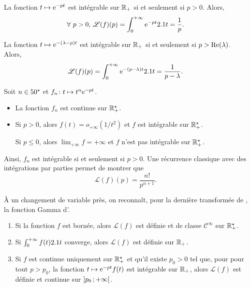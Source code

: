\begin{solution}
\begin{reponses}
\item La fonction $t \mapsto \e^{-pt}$ est intégrable sur $\Rp$ si et seulement si $p > 0$. Alors,
\[
\forall\, p > 0,\,
\mathscr{L}(f)(p) = \int_0^{+\infty} \e^{-pt} \d t = \frac{1}{p}.
\]

\item La fonction $t \mapsto \e^{-(\lambda-p)t}$ est intégrable sur $\Rp$ si et seulement si $p > \Reel(\lambda)$. Alors,
\[
\mathscr{L}(f)(p)
= \int_0^{+\infty} \e^{-(p-\lambda)t} \d t
= \frac{1}{p-\lambda}.
\]

\item Soit $n \in \Ne$ et $\fonctionligne[f_n]{t}{t^n \e^{-pt}}$.
\begin{itemize}
\item La fonction $f_n$ est continue sur $\Rpe$.
\item Si $p > 0$, alors $f(t) = o_{+\infty}(1/t^2)$ et $f$ est intégrable sur $\Rpe$.

Si $p \leqslant 0$, alors $\lim_{+\infty} f = +\infty$ et $f$ n'est pas intégrable sur $\Rpe$.
\end{itemize}
Ainsi, $f_n$ est intégrable si et seulement si $p > 0$. Une récurrence classique avec des intégrations par parties permet de montrer que
\[
\mathscr{L}(f)(p) = \frac{n!}{p^{n+1}}.
\]
\end{reponses}
\end{solution}

\begin{remarque}
À un changement de variable près, on reconnaît, pour la dernière transformée de , la fonction Gamma d'.
\end{remarque}


\begin{theo}
\begin{enumerate}
\item Si la fonction $f$ est bornée, alors $\mathscr{L}(f)$ est définie et de classe $\mathscr{C}^\infty$ sur $\Rpe$.

\item Si $\int_0^{+\infty} f(t) \d t$ converge, alors $\mathscr{L}(f)$ est définie sur $\Rp$.

\item Si $f$ est continue uniquement sur $\Rpe$ et qu'il existe $p_0 > 0$ tel que, pour pour tout $p > p_0$, la fonction $t \mapsto \e^{-p t} f(t)$ est intégrable sur $\Rp$, alors $\mathscr{L}(f)$ est définie et continue sur $\interoo{p_0}{+\infty}$.
\end{enumerate}
\end{theo}

